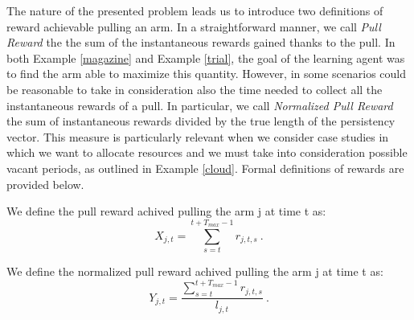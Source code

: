 The nature of the presented problem leads us to introduce two definitions of reward achievable pulling an arm. In a straightforward manner, we call \emph{Pull Reward} the the sum of the instantaneous rewards gained thanks to the pull. In both Example \ref{magazine} and Example \ref{trial}, the goal of the learning agent was to find the arm able to maximize this quantity. However, in some scenarios could be reasonable to take in consideration also the time needed to collect all the instantaneous rewards of a pull. In particular, we call \emph{Normalized Pull Reward} the sum of instantaneous rewards divided by the true length of the persistency vector.
This measure is particularly relevant when we consider case studies in which we want to allocate resources and we must take into consideration possible vacant periods, as outlined in Example \ref{cloud}.
Formal definitions of rewards are provided below.


\begin{definition}
	We define the pull reward achived pulling the arm j at time t as:
		$$X_{j,t} = \sum_{s=t}^{t+T_{max}-1} r_{j,t,s} \ .$$
\end{definition}

\begin{definition}
	We define the normalized pull reward achived pulling the arm j at time t as:
		$$Y_{j,t} = \dfrac{\sum_{s=t}^{t+T_{max}-1} r_{j,t,s}}{l_{j,t}} \ .$$
\end{definition}

